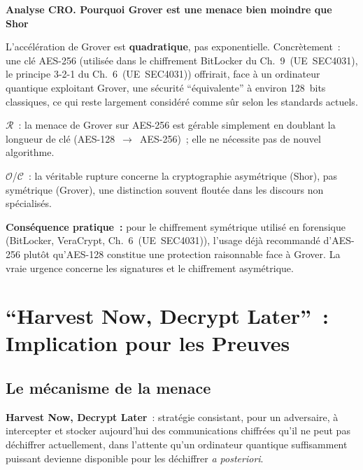 \begin{boxCRO}
\textbf{Analyse CRO. Pourquoi Grover est une menace bien moindre que Shor}

L'accélération de Grover est \textbf{quadratique}, pas exponentielle.
Concrètement~: une clé AES-256 (utilisée dans le chiffrement
BitLocker du Ch.~9~(UE~SEC4031), le principe 3-2-1 du
Ch.~6~(UE~SEC4031)) offrirait, face à un ordinateur quantique
exploitant Grover, une sécurité ``équivalente'' à environ
128~bits classiques, ce qui reste largement considéré comme
sûr selon les standards actuels.

$\mathcal{R}$~: la menace de Grover sur AES-256 est gérable
simplement en doublant la longueur de clé (AES-128~$\to$~AES-256)~;
elle ne nécessite pas de nouvel algorithme.

$\mathcal{O}$/$\mathcal{C}$~: la véritable rupture concerne la
cryptographie asymétrique (Shor), pas symétrique (Grover), une
distinction souvent floutée dans les discours non spécialisés.


\textbf{Conséquence pratique~:} pour le chiffrement symétrique
utilisé en forensique (BitLocker, VeraCrypt, Ch.~6~(UE~SEC4031)),
l'usage déjà recommandé d'AES-256 plutôt qu'AES-128 constitue
une protection raisonnable face à Grover. La vraie urgence
concerne les signatures et le chiffrement asymétrique.
\end{boxCRO}

\section{``Harvest Now, Decrypt Later''~: Implication pour les Preuves}
\label{sec:harvest-now}

\subsection{Le mécanisme de la menace}

\begin{boxdef}
\textbf{Harvest Now, Decrypt Later}~:
stratégie consistant, pour un adversaire, à intercepter et stocker
aujourd'hui des communications chiffrées qu'il ne peut pas
déchiffrer actuellement, dans l'attente qu'un ordinateur quantique
suffisamment puissant devienne disponible pour les déchiffrer
\textit{a posteriori}.
\end{boxdef}

